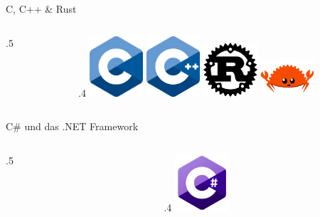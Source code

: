\begin{frame}{C, C++ \& Rust}
    \begin{columns}
        \begin{column}{.5\framewidth}

        \end{column}
        \begin{column}{.4\framewidth}
            \includegraphics[width=2cm]{resources/logos/c}
            \includegraphics[width=2cm]{resources/logos/cpp}
            \includegraphics[width=2cm]{resources/logos/rust}
            \includegraphics[width=2cm]{resources/logos/rust-mascot}
        \end{column}
    \end{columns}
\end{frame}

\begin{frame}{C\# und das .NET Framework}
    \begin{columns}
        \begin{column}{.5\framewidth}

        \end{column}
        \begin{column}{.4\framewidth}
            \includegraphics[width=2cm]{resources/logos/csharp}
        \end{column}
    \end{columns}
\end{frame}

